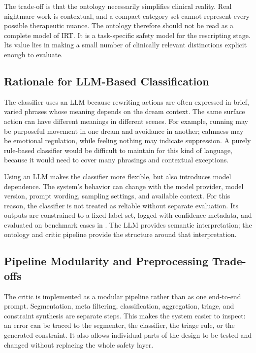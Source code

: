 The trade-off is that the ontology necessarily simplifies clinical reality. Real
nightmare work is contextual, and a compact category set cannot represent every possible
therapeutic nuance. The ontology therefore should not be read as a complete model of
IRT. It is a task-specific safety model for the rescripting stage. Its
value lies in making a small number of clinically relevant distinctions explicit enough
to evaluate.

\subsection{Rationale for LLM-Based Classification}

The classifier uses an LLM because rewriting actions are often expressed in brief,
varied phrases whose meaning depends on the dream context. The same surface action can
have different meanings in different scenes. For
example, running may be purposeful movement in one dream and avoidance in another;
calmness may be emotional regulation, while feeling nothing may indicate suppression.
A purely rule-based classifier would be difficult to maintain for this kind of language,
because it would need to cover many phrasings and contextual exceptions.

Using an LLM makes the classifier more flexible, but also introduces model dependence.
The system's behavior can change with the model provider, model version, prompt wording,
sampling settings, and available context. For this reason, the classifier is not treated
as reliable without separate evaluation. Its outputs are constrained to a fixed label
set, logged with confidence metadata, and evaluated on benchmark cases in
. The LLM provides semantic interpretation; the ontology and
critic pipeline provide the structure around that interpretation.

\subsection{Pipeline Modularity and Preprocessing Trade-offs}

The critic is implemented as a modular pipeline rather than as one end-to-end prompt.
Segmentation, meta filtering, classification, aggregation, triage, and constraint
synthesis are separate steps. This makes the system easier to inspect: an error can be
traced to the segmenter, the classifier, the triage rule, or the generated constraint.
It also allows individual parts of the design to be tested and changed without replacing
the whole safety layer.

